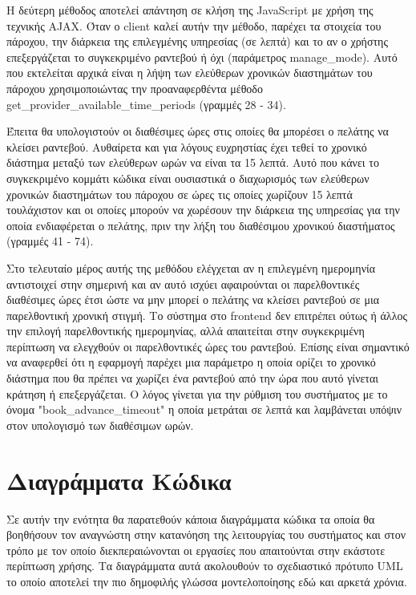 

Η δεύτερη μέθοδος αποτελεί απάντηση σε κλήση της JavaScript με χρήση της τεχνικής AJAX. Όταν ο client καλεί αυτήν την μέθοδο, παρέχει τα στοιχεία του πάροχου, την διάρκεια της επιλεγμένης υπηρεσίας (σε λεπτά) και το αν ο χρήστης επεξεργάζεται το συγκεκριμένο ραντεβού ή όχι (παράμετρος manage\_mode). Αυτό που εκτελείται αρχικά είναι η λήψη των ελεύθερων χρονικών διαστημάτων του πάροχου χρησιμοποιώντας την προαναφερθέντα μέθοδο get\_provider\_available\_time\_periods (γραμμές 28 - 34). 

Έπειτα θα υπολογιστούν οι διαθέσιμες ώρες στις οποίες θα μπορέσει ο πελάτης να κλείσει ραντεβού. Αυθαίρετα και για λόγους ευχρηστίας έχει τεθεί το χρονικό διάστημα μεταξύ των ελεύθερων ωρών να είναι τα 15 λεπτά. Αυτό που κάνει το συγκεκριμένο κομμάτι κώδικα είναι ουσιαστικά ο διαχωρισμός των ελεύθερων χρονικών διαστημάτων του πάροχου σε ώρες τις οποίες χωρίζουν 15 λεπτά τουλάχιστον και οι οποίες μπορούν να χωρέσουν την διάρκεια της υπηρεσίας για την οποία ενδιαφέρεται ο πελάτης, πριν την λήξη του διαθέσιμου χρονικού διαστήματος (γραμμές 41 - 74).

Στο τελευταίο μέρος αυτής της μεθόδου ελέγχεται αν η επιλεγμένη ημερομηνία αντιστοιχεί στην σημερινή και αν αυτό ισχύει αφαιρούνται οι παρελθοντικές διαθέσιμες ώρες έτσι ώστε να μην μπορεί ο πελάτης να κλείσει ραντεβού σε μια παρελθοντική χρονική στιγμή. Το σύστημα στο frontend δεν επιτρέπει ούτως ή άλλος την επιλογή παρελθοντικής ημερομηνίας, αλλά απαιτείται στην συγκεκριμένη περίπτωση να ελεγχθούν οι παρελθοντικές ώρες του ραντεβού. Επίσης είναι σημαντικό να αναφερθεί ότι η εφαρμογή παρέχει μια παράμετρο η οποία ορίζει το χρονικό διάστημα που θα πρέπει να χωρίζει ένα ραντεβού από την ώρα που αυτό γίνεται κράτηση ή επεξεργάζεται. Ο λόγος γίνεται για την ρύθμιση του συστήματος με το όνομα "book\_advance\_timeout" η οποία μετράται σε λεπτά και λαμβάνεται υπόψιν στον υπολογισμό των διαθέσιμων ωρών.

\section{Διαγράμματα Κώδικα}
Σε αυτήν την ενότητα θα παρατεθούν κάποια διαγράμματα κώδικα τα οποία θα βοηθήσουν τον αναγνώστη στην κατανόηση της λειτουργίας του συστήματος και στον τρόπο με τον οποίο διεκπεραιώνονται οι εργασίες που απαιτούνται στην εκάστοτε περίπτωση χρήσης. Τα διαγράμματα αυτά ακολουθούν το σχεδιαστικό πρότυπο UML το οποίο αποτελεί την πιο δημοφιλής γλώσσα μοντελοποίησης εδώ και αρκετά χρόνια.

